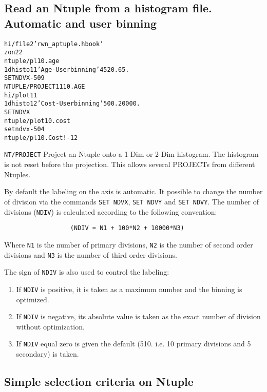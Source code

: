 \subsection*{Read an Ntuple from a histogram file. Automatic and user
  binning}
\begin{alltt}
      hi/file 2 'rwn_aptuple.hbook'
      zon 2 2
      ntuple/pl 10.age
      1dhisto 11 'Age - User binning' 45 20. 65.
     SET NDVX -509
     NTUPLE/PROJECT 11 10.AGE
      hi/plot 11
      1dhisto 12 'Cost - User binning' 50 0. 20000.
     SET NDVX
      ntuple/plot 10.cost
      set ndvx -504
      ntuple/pl 10.Cost ! -12
\end{alltt} 
\begin{DinglistE}
\item {\tt NT/PROJECT} Project an Ntuple onto a 1-Dim or 2-Dim
      histogram. The histogram is not reset before the projection. This
      allows several PROJECTs from different Ntuples.
\item By default the labeling on the axis is automatic. It
      possible to change the number of division via the commands
      {\tt SET NDVX}, {\tt SET NDVY} and {\tt SET NDVY}.
      The number of divisions ({\tt NDIV}) is calculated according to the
      following convention:
\begin{verbatim}
                  (NDIV = N1 + 100*N2 + 10000*N3)
\end{verbatim}
Where {\tt N1} is the number of primary divisions, {\tt N2} is the number of
second order divisions and {\tt N3} is the number of third order divisions.

The sign of {\tt NDIV} is also used to control the labeling:
\begin{enumerate}
\item If {\tt NDIV} is positive, it is taken as a maximum number and the
      binning is optimized.
\item If {\tt NDIV} is negative, its absolute value is taken as the exact
      number of division without optimization.
\item If {\tt NDIV} equal zero is given the default (510. i.e. 10 primary
      divisions and 5 secondary) is taken.
\end{enumerate}
\end{DinglistE}

\clearpage

\subsection{Simple selection criteria on Ntuple}
